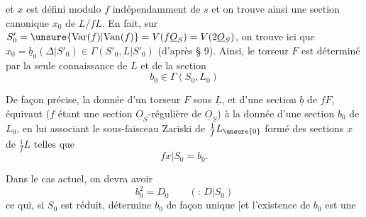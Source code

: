 et $x$ est défini modulo $f$ indépendamment de $s$ et on trouve ainsi une section canonique $x_0$ de $L/fL$. En fait,  sur $S'_0=\unsure{\mathrm{Var}(f)|\mathrm{Van}(f)}=V(f\underline O_S)=V(2\underline O_S)$, on trouve ici que $x_0=\underline b_{0}(\Delta|S'_0)\in\Gamma(S'_0,L|S'_0)$ (d'après § 9). Ainsi, le torseur $F$ est déterminé  par la seule connaissance de  $L$ et de la section
\[b_0\in\Gamma(S_0,L_0)\tag*{(105)}\]

De façon précise, la donnée d'un torseur $F$ sous $\underline L$, et d'une section $\underline b$ de $fF$, équivaut  ($f$ étant une section $\underline O_S$-régulière de $\underline O_S$) à la donnée d'une section $b_0$ de $L_0$, en lui associant le  sous-faisceau Zariski de $\frac1f L_{\unsure{0}}$ formé des sections  $x$ de $\frac1f L$ telles que
\[fx|S_0=b_0.\]


Dans le cas actuel, on devra avoir
\[b_0^2=D_0\qquad({:}\,D|S_0)\tag*{(106)}\]
ce qui, si $S_0$ est réduit, détermine $b_0$ de façon unique [et l'existence de $b_0$ est une
